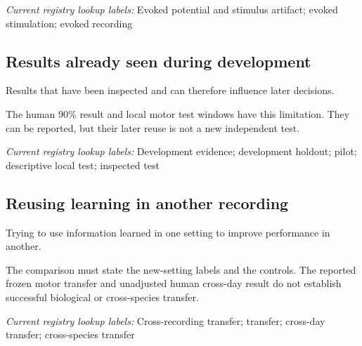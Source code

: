 \noindent\textit{Current registry lookup labels:} Evoked potential and stimulus artifact; evoked stimulation; evoked recording\par

\begin{samepage}
\subsection*{Results already seen during development}
\noindent Results that have been inspected and can therefore influence later decisions.\par
\end{samepage}
\begin{samepage}
\noindent The human 90\% result and local motor test windows have this limitation. They can be reported, but their later reuse is not a new independent test.\par\nopagebreak[4]

\end{samepage}


\noindent\textit{Current registry lookup labels:} Development evidence; development holdout; pilot; descriptive local test; inspected test\par

\begin{samepage}
\subsection*{Reusing learning in another recording}
\noindent Trying to use information learned in one setting to improve performance in another.\par
\end{samepage}
\begin{samepage}
\noindent The comparison must state the new-setting labels and the controls. The reported frozen motor transfer and unadjusted human cross-day result do not establish successful biological or cross-species transfer.\par\nopagebreak[4]

\end{samepage}


\noindent\textit{Current registry lookup labels:} Cross-recording transfer; transfer; cross-day transfer; cross-species transfer\par


